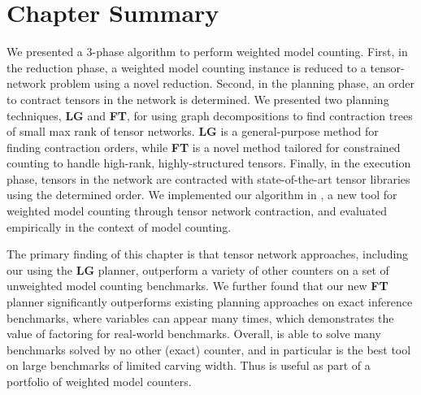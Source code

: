\section{Chapter Summary} \label{sec:tensors:conclusion}
We presented a 3-phase algorithm to perform weighted model counting. First, in the reduction phase, a weighted model counting instance is reduced to a tensor-network problem using a novel reduction. Second, in the planning phase, an order to contract tensors in the network is determined. We presented two planning techniques, \textbf{LG} and \textbf{FT}, for using graph decompositions to find contraction trees of small max rank of tensor networks. \textbf{LG} is a general-purpose method for finding contraction orders, while \textbf{FT} is a novel method tailored for constrained counting to handle high-rank, highly-structured tensors. Finally, in the execution phase, tensors in the network are contracted with state-of-the-art tensor libraries using the determined order.
We implemented our algorithm in , a new tool for weighted model counting through tensor network contraction, and evaluated  empirically in the context of model counting.

{ \color{blue}
The primary finding of this chapter is that tensor network approaches, including our  using the \textbf{LG} planner, outperform a variety of other counters on a set of unweighted model counting benchmarks.
We further found that our new \textbf{FT} planner significantly outperforms existing planning approaches on exact inference benchmarks, where variables can appear many times, which demonstrates the value of factoring for real-world benchmarks.
Overall,  is able to solve many benchmarks solved by no other (exact) counter, and in particular  is the best tool on large benchmarks of limited carving width.
Thus  is useful as part of a portfolio of weighted model counters.
} %


